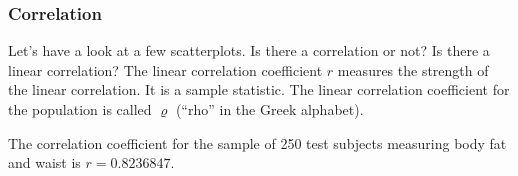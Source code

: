 \documentclass[xcolor=dvipsnames]{beamer}
\begin{document}



\begin{frame}
  \frametitle{Correlation}
  Let's have a look at a few scatterplots. Is there a correlation or
  not? Is there a linear correlation? The \alert{linear correlation
    coefficient} $r$ measures the strength of the linear correlation.
  It is a sample statistic. The linear correlation coefficient for the
  population is called $\varrho$ (``rho'' in the Greek alphabet).

  \bigskip

  The correlation coefficient for the sample of 250 test subjects
  measuring body fat and waist is $r=0.8236847$.
\end{frame}
\end{document}
